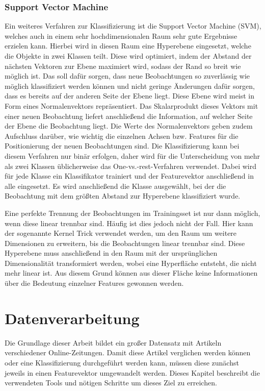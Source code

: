\subsection{Support Vector Machine}
Ein weiteres Verfahren zur Klassifizierung ist die Support Vector Machine (SVM), welches auch in einem sehr hochdimensionalen Raum sehr gute Ergebnisse erzielen kann. Hierbei wird in diesen Raum eine Hyperebene eingesetzt, welche die Objekte in zwei Klassen teilt. Diese wird optimiert, indem der Abstand der nächsten Vektoren zur Ebene maximiert wird, sodass der Rand so breit wie möglich ist. Das soll dafür sorgen, dass neue Beobachtungen so zuverlässig wie möglich klassifiziert werden können und nicht geringe Änderungen dafür sorgen, dass es bereits auf der anderen Seite der Ebene liegt. Diese Ebene wird meist in Form eines Normalenvektors repräsentiert. Das Skalarprodukt dieses Vektors mit einer neuen Beobachtung liefert anschließend die Information, auf welcher Seite der Ebene die Beobachtung liegt. Die Werte des Normalenvektors geben zudem Aufschluss darüber, wie wichtig die einzelnen Achsen bzw. Features für die Positionierung der neuen Beobachtungen sind. Die Klassifizierung kann bei diesem Verfahren nur binär erfolgen, daher wird für die Unterscheidung von mehr als zwei Klassen üblicherweise das One-vs.-rest-Verfahren verwendet. Dabei wird für jede Klasse ein Klassifikator trainiert und der Featurevektor anschließend in alle eingesetzt. Es wird anschließend die Klasse ausgewählt, bei der die Beobachtung mit dem größten Abstand zur Hyperebene klassifiziert wurde.

Eine perfekte Trennung der Beobachtungen im Trainingsset ist nur dann möglich, wenn diese linear trennbar sind. Häufig ist dies jedoch nicht der Fall. Hier kann der sogenannte Kernel Trick verwendet werden, um den Raum um weitere Dimensionen zu erweitern, bis die Beobachtungen linear trennbar sind. Diese Hyperebene muss anschließend in den Raum mit der ursprünglichen Dimensionalität transformiert werden, wobei eine Hyperfläche entsteht, die nicht mehr linear ist. Aus diesem Grund können aus dieser Fläche keine Informationen über die Bedeutung einzelner Features gewonnen werden.

\chapter{Datenverarbeitung}
Die Grundlage dieser Arbeit bildet ein großer Datensatz mit Artikeln verschiedener Online-Zeitungen. Damit diese Artikel verglichen werden können oder eine Klassifizierung durchgeführt werden kann, müssen diese zunächst jeweils in einen Featurevektor umgewandelt werden. Dieses Kapitel beschreibt die verwendeten Tools und nötigen Schritte um dieses Ziel zu erreichen.

